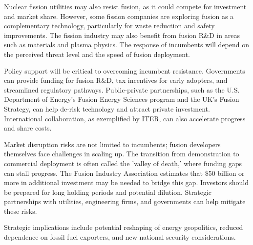 \documentclass[10pt,a4paper]{article}
\begin{document}
{\small Nuclear fission utilities may also resist fusion, as it could compete for investment and market share. However, some fission companies are exploring fusion as a complementary technology, particularly for waste reduction and safety improvements. The fission industry may also benefit from fusion R\&D in areas such as materials and plasma physics. The response of incumbents will depend on the perceived threat level and the speed of fusion deployment.}\par
{\small Policy support will be critical to overcoming incumbent resistance. Governments can provide funding for fusion R\&D, tax incentives for early adopters, and streamlined regulatory pathways. Public-private partnerships, such as the U.S. Department of Energy's Fusion Energy Sciences program and the UK's Fusion Strategy, can help de-risk technology and attract private investment. International collaboration, as exemplified by ITER, can also accelerate progress and share costs.}\par
{\small Market disruption risks are not limited to incumbents; fusion developers themselves face challenges in scaling up. The transition from demonstration to commercial deployment is often called the 'valley of death,' where funding gaps can stall progress. The Fusion Industry Association estimates that \$50 billion or more in additional investment may be needed to bridge this gap. Investors should be prepared for long holding periods and potential dilution. Strategic partnerships with utilities, engineering firms, and governments can help mitigate these risks.}\par
{\small Strategic implications include potential reshaping of energy geopolitics, reduced dependence on fossil fuel exporters, and new national security considerations.}\par
\label{chap:4:end}
\end{document}
